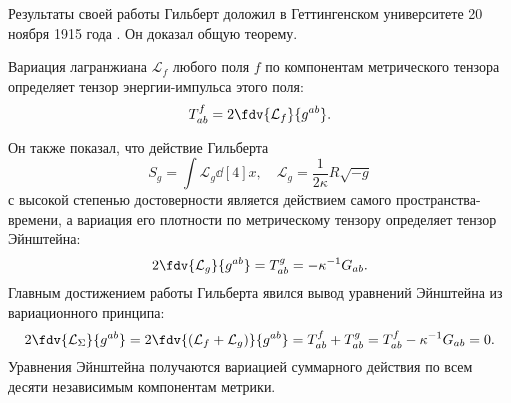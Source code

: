 \documentclass[\docroot/reports/draft/report.tex]{subfiles}
\begin{document}
    Результаты своей работы Гильберт доложил в Геттингенском университете 20 ноября 1915 года \cite{gilbert_phys}. Он доказал общую теорему.
    \begin{theorem*}
        Вариация лагранжиана $\mathcal{L}_f$ любого поля $f$ по компонентам метрического тензора определяет тензор энергии-импульса этого поля:
        \begin{equation*}
            T^f_{ab} = 2 \fdv{\mathcal{L}_f}{g^{ab}} .
        \end{equation*}
    \end{theorem*}
    Он также показал, что действие Гильберта
    \begin{equation*}
        S_g = \int \mathcal{L}_g \dd[4]{x} , \quad \mathcal{L}_g = \frac{1}{2 \kappa} R \sqrt{-g}
    \end{equation*}
    с высокой степенью достоверности является действием самого пространства-времени, а вариация его плотности по метрическому тензору определяет тензор Эйнштейна:
    \begin{equation*}
        2\fdv{\mathcal{L}_g}{g^{ab}} = T^g_{ab} = - \kappa^{-1} G_{ab} .
    \end{equation*}
    Главным достижением работы Гильберта явился вывод уравнений Эйнштейна из вариационного принципа:
    \begin{equation*}
        2 \fdv{\mathcal{L}_\Sigma}{g^{ab}} =
        2 \fdv{(\mathcal{L}_f + \mathcal{L}_g)}{g^{ab}} =
        T^f_{ab} + T^g_{ab} =
        T^f_{ab} - \kappa^{-1} G_{ab} =
        0 .
    \end{equation*}
    Уравнения Эйнштейна получаются вариацией суммарного действия по всем десяти независимым компонентам метрики.

\end{document}
